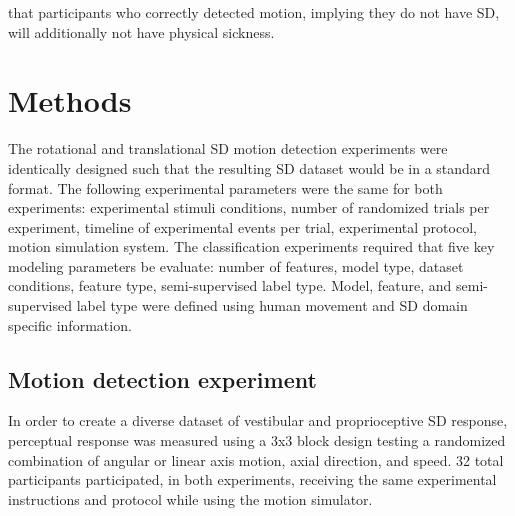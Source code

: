 \documentclass[11pt, onecolumn]{article}
\begin{document}
that participants who correctly detected motion, implying they do not have SD, will additionally not have physical sickness.



\section{Methods}
The rotational and translational SD motion detection experiments were identically designed such that the resulting SD dataset would be in a standard format.  The following experimental parameters were the same for both experiments: experimental stimuli conditions, number of randomized trials per experiment, timeline of experimental events per trial, experimental protocol, motion simulation system.  The classification experiments required that five key modeling parameters be evaluate: number of features, model type, dataset conditions, feature type, semi-supervised label type. Model, feature, and semi-supervised label type were defined using human movement and SD domain specific information.

\subsection{Motion detection experiment}
In order to create a diverse dataset of vestibular and proprioceptive SD response, perceptual response was measured using a 3x3 block design testing a randomized combination of angular or linear axis motion, axial direction, and speed.  32 total participants participated, in both experiments, receiving the same experimental instructions and protocol while using the motion simulator.
\end{document}
